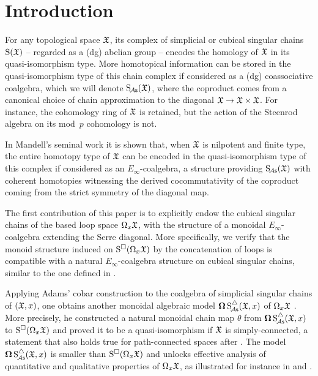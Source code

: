 
\section{Introduction}

For any topological space $\mathfrak{X}$, its complex of simplicial or cubical singular chains $\operatorname{S}(\mathfrak{X})$ -- regarded as a (dg) abelian group -- encodes the homology of $\mathfrak{X}$ in its quasi-isomorphism type.
More homotopical information can be stored in the quasi-isomorphism type of this chain complex if considered as a (dg) coassociative coalgebra, which we will denote $\operatorname{S_{\!{\mathcal{A}\mathsf{s}}}}(\mathfrak{X})$, where the coproduct comes from a canonical choice of chain approximation to the diagonal $\mathfrak{X} \to \mathfrak{X} \times \mathfrak{X}$.
For instance, the cohomology ring of $\mathfrak{X}$ is retained, but the action of the Steenrod algebra on its mod~$p$ cohomology is not.

In Mandell's seminal work \cite{mandell2006homotopy_type} it is shown that, when $\mathfrak{X}$ is nilpotent and finite type, the entire homotopy type of $\mathfrak{X}$ can be encoded in the quasi-isomorphism type of this complex if considered as an $E_\infty$-coalgebra, a structure providing $\operatorname{S_{\!{\mathcal{A}\mathsf{s}}}}(\mathfrak{X})$ with coherent homotopies witnessing the derived cocommutativity of the coproduct coming from the strict symmetry of the diagonal map.

The first contribution of this paper is to explicitly endow the cubical singular chains of the based loop space $\Omega_x \mathfrak{X}$, with the structure of a monoidal $E_\infty$-coalgebra extending the Serre diagonal.
More specifically, we verify that the monoid structure induced on $\operatorname{S^{\square}}(\Omega_x \mathfrak{X})$ by the concatenation of loops is compatible with a natural $E_\infty$-coalgebra structure on cubical singular chains, similar to the one defined in \cite{medina2022cube_einfty}.

Applying Adams' cobar construction to the coalgebra of simplicial singular chains of $(\mathfrak{X}, x)$, one obtains another monoidal algebraic model $\operatorname{\mathbf{\Omega}} \operatorname{S^{\triangle}_{\!{\mathcal{A}\mathsf{s}}}}(\mathfrak{X}, x)$ of $\Omega_x \mathfrak{X}$ \cite{adams1956cobar}.
More precisely, he constructed a natural monoidal chain map $\theta$ from $\operatorname{\mathbf{\Omega}} \operatorname{S^{\triangle}_{\!{\mathcal{A}\mathsf{s}}}}(\mathfrak{X}, x)$ to $\operatorname{S^{\square}}(\Omega_x \mathfrak{X})$ and proved it to be a quasi-isomorphism if $\mathfrak{X}$ is simply-connected, a statement that also holds true for path-connected spaces after \cite{rivera2018cubical}.
The model $\operatorname{\mathbf{\Omega}} \operatorname{S^{\triangle}_{\!{\mathcal{A}\mathsf{s}}}}(\mathfrak{X}, x)$ is smaller than $\operatorname{S^{\square}}(\Omega_x \mathfrak{X})$ and unlocks effective analysis of quantitative and qualitative properties of $\Omega_x \mathfrak{X}$, as illustrated for instance in \cite{chainalgebraloops} and \cite{adamscobarequivalence}.

